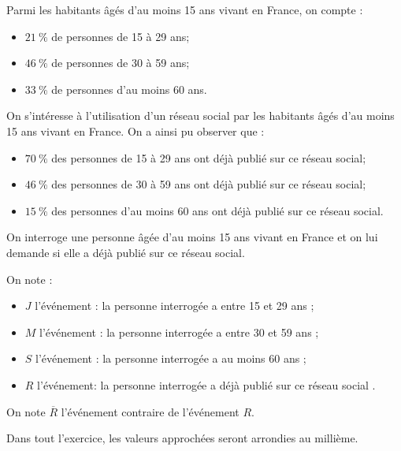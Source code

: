 Parmi les habitants âgés d'au moins 15 ans vivant en France, on compte :

\begin{itemize}[label=\textbullet~]
	\item $21~\%$ de personnes de 15 à 29 ans;
	\item $46~\%$ de personnes de 30 à 59 ans;
	\item $33~\%$ de personnes d'au moins 60 ans.
\end{itemize}

On s'intéresse à l'utilisation d'un réseau social par les habitants âgés d'au moins 15 ans vivant en France. On a ainsi pu observer que :

\begin{itemize}[label=\textbullet~]
	\item $70~\%$ des personnes de 15 à 29 ans ont déjà publié sur ce réseau social;
	\item $46~\%$ des personnes de 30 à 59 ans ont déjà publié sur ce réseau social;
	\item $15~\%$ des personnes d'au moins 60 ans ont déjà publié sur ce réseau social.
\end{itemize}

On interroge une personne âgée d'au moins 15 ans vivant en France et on lui demande si elle a déjà publié sur ce réseau social.

On note :

\begin{itemize}[label=\textbullet~]
	\item $J$ l'événement : \og la personne interrogée a entre 15 et 29 ans \fg{};
	\item $M$ l'événement : \og la personne interrogée a entre 30 et 59 ans \fg{};
	\item $S$ l'événement : \og la personne interrogée a au moins 60 ans \fg{};
	\item $R$ l'événement: \og la personne interrogée a déjà publié sur ce réseau social \fg{}.
\end{itemize}

On note $\overline{R}$ l'événement contraire de l'événement $R$.

Dans tout l'exercice, les valeurs approchées seront arrondies au millième.

